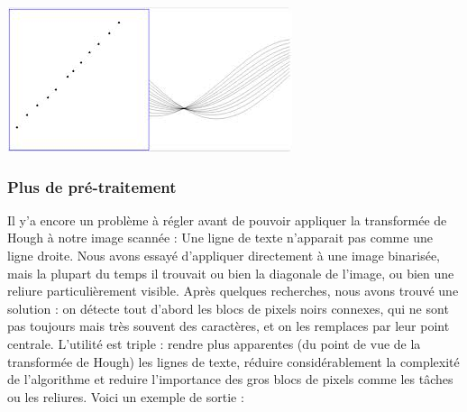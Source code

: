 \includegraphics[scale=0.7]{chapters/Pictures/hough2.jpg}\\
\subsubsection{Plus de pré-traitement}

Il y'a encore un problème à régler avant de pouvoir appliquer la transformée de Hough à notre image scannée : Une ligne de texte n'apparait pas comme une ligne droite. Nous avons essayé d'appliquer directement à une image binarisée, mais la plupart du temps il trouvait ou bien la diagonale de l'image, ou bien une reliure particulièrement visible. Après quelques recherches, nous avons trouvé une solution : on détecte tout d'abord les blocs de pixels noirs connexes, qui ne sont pas toujours mais très souvent des caractères, et on les remplaces par leur point centrale. L'utilité est triple : rendre plus apparentes (du point de vue de la transformée de Hough) les lignes de texte, réduire considérablement la complexité de l'algorithme et reduire l'importance des gros blocs de pixels comme les tâches ou les reliures. Voici un exemple de sortie :

